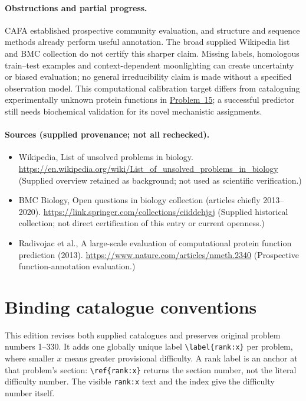 \documentclass[11pt]{article}
\begin{document}
\paragraph{Obstructions and partial progress.} CAFA established prospective community evaluation, and structure and sequence methods already perform useful annotation. The broad supplied Wikipedia list and BMC collection do not certify this sharper claim. Missing labels, homologous train--test examples and context-dependent moonlighting can create uncertainty or biased evaluation; no general irreducibility claim is made without a specified observation model. This computational calibration target differs from cataloguing experimentally unknown protein functions in \href{https://we-solve.github.io/problems/function-of-uncharacterised-proteins-80d5e5a2/}{Problem~15}; a successful predictor still needs biochemical validation for its novel mechanistic assignments.
\paragraph{Sources (supplied provenance; not all rechecked).}
\begin{itemize}
\item Wikipedia, List of unsolved problems in biology. \url{https://en.wikipedia.org/wiki/List_of_unsolved_problems_in_biology} (Supplied overview retained as background; not used as scientific verification.)
\item BMC Biology, Open questions in biology collection (articles chiefly 2013--2020). \url{https://link.springer.com/collections/eiiddehjgj} (Supplied historical collection; not direct certification of this entry or current openness.)
\item Radivojac et al., A large-scale evaluation of computational protein function prediction (2013). \url{https://www.nature.com/articles/nmeth.2340} (Prospective function-annotation evaluation.)
\end{itemize}


\section*{Binding catalogue conventions}
This edition revises both supplied catalogues and preserves original problem numbers 1--330. It adds one globally unique label \verb|\label{rank:x}| per problem, where smaller $x$ means greater provisional difficulty. A rank label is an anchor at that problem's section: \verb|\ref{rank:x}| returns the section number, not the literal difficulty number. The visible \texttt{rank:x} text and the index give the difficulty number itself.
\end{document}
